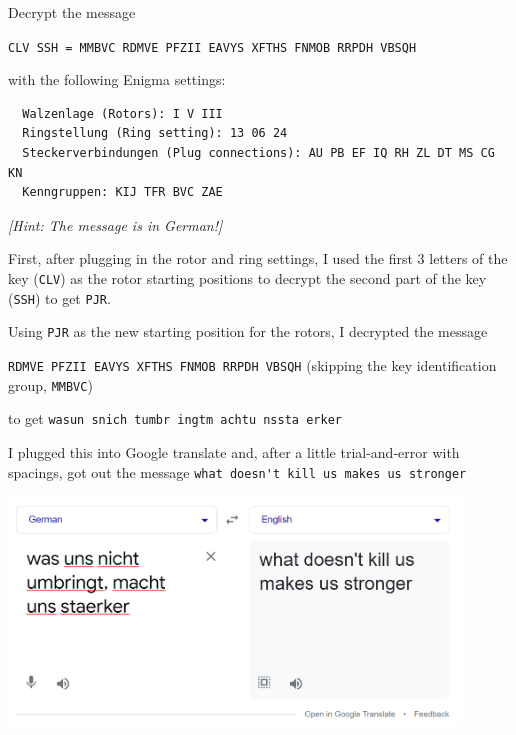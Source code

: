 \begin{problem}
  Decrypt the message
  \begin{center}
  \texttt{CLV SSH = MMBVC RDMVE PFZII EAVYS XFTHS FNMOB RRPDH VBSQH}
  \end{center}
  with the following Enigma settings: 
  \begin{Verbatim}
  Walzenlage (Rotors): I V III
  Ringstellung (Ring setting): 13 06 24
  Steckerverbindungen (Plug connections): AU PB EF IQ RH ZL DT MS CG KN
  Kenngruppen: KIJ TFR BVC ZAE
  \end{Verbatim}
  \emph{[Hint: The message is in German!]}
  \end{problem}

\begin{Answer}
First, after plugging in the rotor and ring settings,
I used the first $3$ letters of the key (\verb#CLV#)
as the rotor starting positions to
decrypt the second part of the key (\verb#SSH#) to 
get \verb#PJR#.

\noindent
Using \verb#PJR# as the new starting position for the rotors, I decrypted the message

\verb#RDMVE PFZII EAVYS XFTHS FNMOB RRPDH VBSQH#
(skipping the key identification group, \verb#MMBVC#)

to get \verb#wasun snich tumbr ingtm achtu nssta erker#

\noindent
I plugged this into Google translate and, after a little trial-and-error
with spacings, got out the message 
\color{crimson}
\verb#what doesn't kill us makes us stronger#
\color{black}

\includegraphics*[width=120mm]{enigma_decrypt.png}
\end{Answer}
